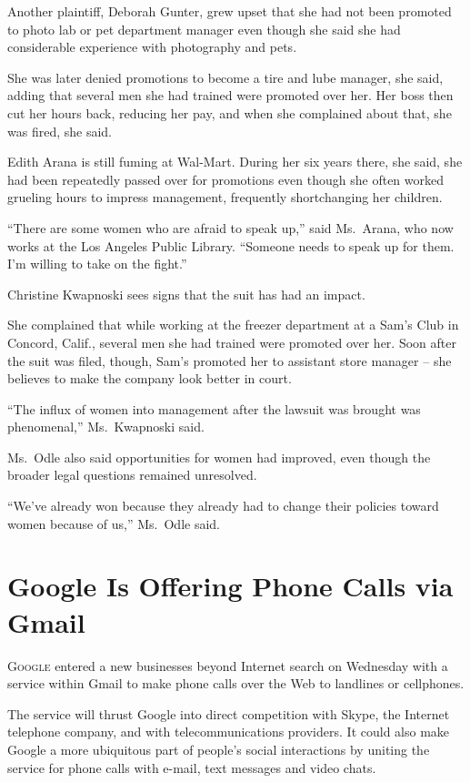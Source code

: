 ﻿\documentclass[12pt]{article}
\begin{document}
Another plaintiff, Deborah Gunter, grew upset that she had not been promoted to photo lab or pet
department manager even though she said she had considerable experience with photography and pets.

She was later denied promotions to become a tire and lube manager, she said, adding that several men
she had trained were promoted over her. Her boss then cut her hours back, reducing her pay, and when
she complained about that, she was fired, she said.

Edith Arana is still fuming at Wal-Mart. During her six years there, she said, she had been
repeatedly passed over for promotions even though she often worked grueling hours to impress
management, frequently shortchanging her children.

``There are some women who are afraid to speak up,'' said Ms.~Arana, who now works at the Los
Angeles Public Library. ``Someone needs to speak up for them. I'm willing to take on the fight.''

Christine Kwapnoski sees signs that the suit has had an impact.

She complained that while working at the freezer department at a Sam's Club in Concord, Calif.,
several men she had trained were promoted over her. Soon after the suit was filed, though, Sam's
promoted her to assistant store manager -- she believes to make the company look better in court.

``The influx of women into management after the lawsuit was brought was phenomenal,'' Ms.~Kwapnoski
said.

Ms.~Odle also said opportunities for women had improved, even though the broader legal questions
remained unresolved.

``We've already won because they already had to change their policies toward women because of us,''
Ms.~Odle said.

\pagebreak
\section{Google Is Offering Phone Calls via Gmail}

\lettrine{G}{oogle} entered a new businesses beyond Internet search on
Wednesday with a service within Gmail to make phone calls over the Web to landlines or cellphones.

The service will thrust Google into direct competition with Skype, the Internet telephone company,
and with telecommunications providers. It could also make Google a more ubiquitous part of people's
social interactions by uniting the service for phone calls with e-mail, text messages and video
chats.
\end{document}
